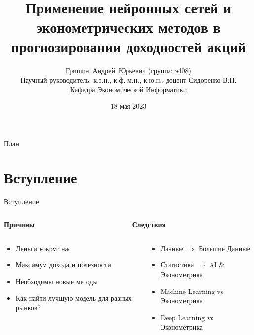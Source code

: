 \documentclass[11pt, aspectratio= 169]{beamer}
\title[Прогнозирование доходностей акций]{Применение нейронных сетей и эконометрических методов в прогнозировании доходностей акций}
\author[Гришин А.Ю.]{Гришин~Андрей~Юрьевич ({\small группа: э408})\\\vspace{10pt}Научный руководитель: к.э.н., к.ф.-м.н., к.ю.н., доцент Сидоренко В.Н.\\\vspace{10pt}Кафедра Экономической Информатики}
\institute[ЭФ МГУ]{Экономический Факультет Московского Государтвенного Университета}
\date{18 мая 2023}
\begin{document}
	\begin{frame}
		\maketitle
	\end{frame}
	
	\begin{frame}{План}
		\tableofcontents
	\end{frame}
	
	\section{Вступление}
	\begin{frame}{Вступление}
		\begin{columns}
			\begin{column}{0.5\textwidth}
				\centering
				\begin{LARGE}
					\textbf{Причины}
				\end{LARGE}
			\end{column}
			\begin{column}{0.5\textwidth}
				\centering
				\begin{LARGE}
					\textbf{Следствия}
				\end{LARGE}
			\end{column}
		\end{columns}
		\vspace{0.3cm}
		\begin{columns}
			\begin{column}{0.5\textwidth}
				\large
				\begin{itemize}
					\item Деньги вокруг нас
					\item Максимум дохода и полезности
					\item Необходимы новые методы
					\item Как найти лучшую модель для разных рынков?
				\end{itemize}
			\end{column}
			\hspace{0.5cm}
			\begin{column}{0.5\textwidth}
				\large
				\begin{itemize}
					\item Данные $\Rightarrow$ Большие Данные
					\item Статистика $\Rightarrow$ AI \& Эконометрика
					\item Machine Learning vs Эконометрика
					\item Deep Learning vs Эконометрика
				\end{itemize}
			\end{column}
		\end{columns}
	\end{frame}
\end{document}
